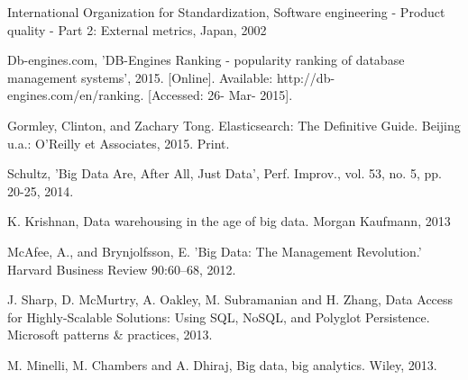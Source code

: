 \begin{thebibliography}{69}
 International Organization for Standardization, Software engineering - Product quality - Part 2: External metrics, Japan, 2002   

 Db-engines.com, 'DB-Engines Ranking - popularity ranking of database management systems', 2015. [Online]. Available: http://db-engines.com/en/ranking. [Accessed: 26- Mar- 2015].

 Gormley, Clinton, and Zachary Tong. Elasticsearch: The Definitive Guide. Beijing u.a.: O'Reilly et Associates, 2015. Print.

 Schultz, 'Big Data Are, After All, Just Data', Perf. Improv., vol. 53, no. 5, pp. 20-25, 2014.

 K. Krishnan, Data warehousing in the age of big data. Morgan Kaufmann, 2013

 McAfee, A., and Brynjolfsson, E. 'Big Data: The Management Revolution.' Harvard Business Review 90:60–68, 2012.

 J.  Sharp, D.  McMurtry, A.  Oakley, M.  Subramanian and H.  Zhang, Data Access for Highly-Scalable Solutions: Using SQL, NoSQL, and Polyglot Persistence. Microsoft patterns \& practices, 2013.

M. Minelli, M. Chambers and A. Dhiraj, Big data, big analytics. Wiley, 2013. 

\end{thebibliography}
